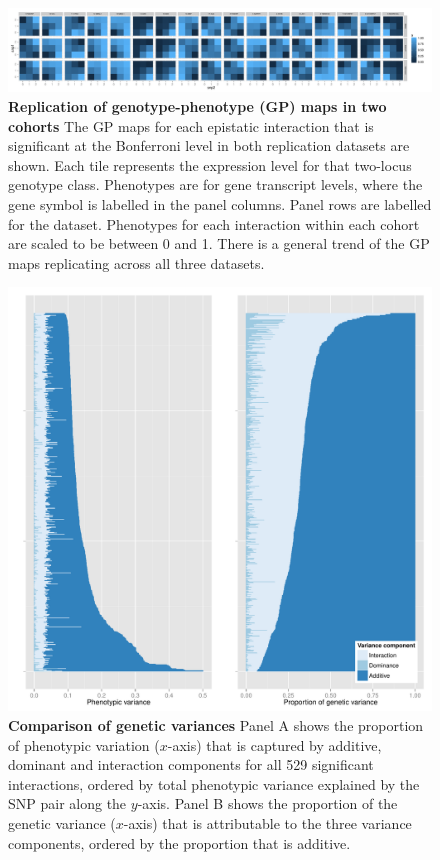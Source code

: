 \documentclass{article}
\begin{document}
\begin{figure}[H]
	\includegraphics[width=5in]{gpbonfrep.pdf}
	\caption{\textbf{Replication of genotype-phenotype (GP) maps in two cohorts} The GP maps for each epistatic interaction that is significant at the Bonferroni level in both replication datasets are shown. Each tile represents the expression level for that two-locus genotype class. Phenotypes are for gene transcript levels, where the gene symbol is labelled in the panel columns. Panel rows are labelled for the dataset. Phenotypes for each interaction within each cohort are scaled to be between 0 and 1. There is a general trend of the GP maps replicating across all three datasets.}
	\label{fig:gpmaps}
\end{figure}
\clearpage

\begin{figure}[H]
	\includegraphics[width=5in]{variance_components.pdf}
	\caption{\textbf{Comparison of genetic variances} Panel A shows the proportion of phenotypic variation ($x$-axis) that is captured by additive, dominant and interaction components for all 529 significant interactions, ordered by total phenotypic variance explained by the SNP pair along the $y$-axis. Panel B shows the proportion of the genetic variance ($x$-axis) that is attributable to the three variance components, ordered by the proportion that is additive.}
	\label{fig:variancecomponents}
\end{figure}
\clearpage
\end{document}

